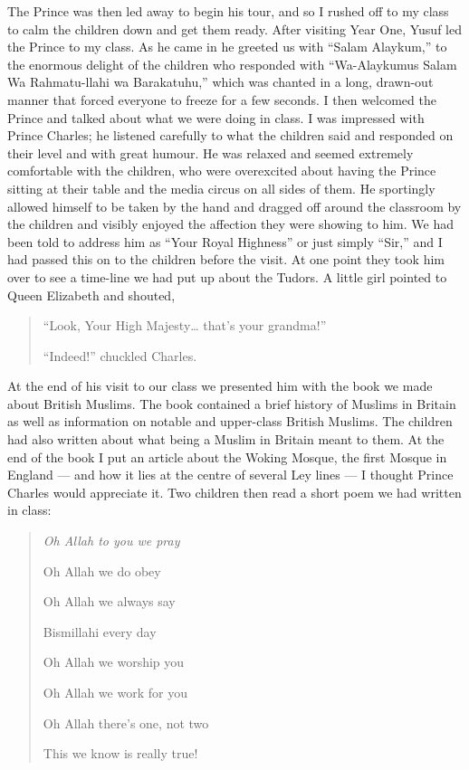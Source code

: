 \documentclass[12pt]{memoir}
\begin{document}
The Prince was then led away to begin his tour,
and so I rushed off to my class to calm the children down and get them ready.
After visiting Year One, Yusuf led the Prince to my class.
As he came in he greeted us with “Salam Alaykum,”
to the enormous delight of the children who responded with
“Wa-Alaykumus Salam Wa Rahmatu-llahi wa Barakatuhu,”
which was chanted in a long, drawn-out manner
that forced everyone to freeze for a few seconds.
I then welcomed the Prince and talked about what we were doing in class.
I was impressed with Prince Charles;
he listened carefully to what the children said
and responded on their level and with great humour.
He was relaxed and seemed extremely comfortable with the children,
who were over\–excited about having the Prince sitting at their table
and the media circus on all sides of them.
He sportingly allowed himself to be taken by the hand
and dragged off around the classroom by the children
and visibly enjoyed the affection they were showing to him.
We had been told  to address him as
“Your Royal Highness” or just simply “Sir,”
and I had passed this on to the children before the visit.
At one point they took him over to see a time-line
we had put up about the Tudors.
A little girl pointed to Queen Elizabeth and shouted,

\begin{quote}
“Look, Your High Majesty… that’s your grandma!”

“Indeed!” chuckled Charles.
\end{quote}

At the end of his visit to our class we presented him
with the book we made about British Muslims.
The book contained a brief history of Muslims in Britain
as well as information on notable and upper-class British Muslims.
The children had also written about
what being a Muslim in Britain meant to them.
At the end of the book I put an article about the Woking Mosque,
the first Mosque in England —
and how it lies at the centre of several Ley lines —
I thought Prince Charles would appreciate it.
Two children then read a short poem we had written in class:

\begin{quote}
\itshape
Oh Allah to you we pray

Oh Allah we do obey

Oh Allah we always say

Bismillahi every day

Oh Allah we worship you

Oh Allah we work for you

Oh Allah there’s one, not two

This we know is really true!
\end{quote}
\end{document}
